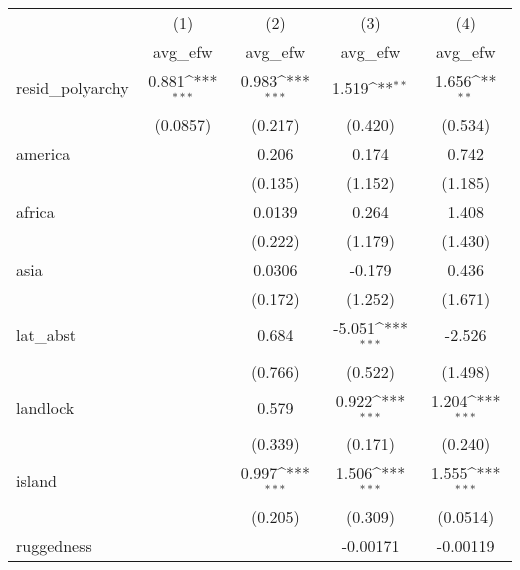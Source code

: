 {
\def\sym#1{\ifmmode^{#1}\else\(^{#1}\)\fi}
\begin{tabular}{l*{4}{c}}
\hline\hline
            &\multicolumn{1}{c}{(1)}&\multicolumn{1}{c}{(2)}&\multicolumn{1}{c}{(3)}&\multicolumn{1}{c}{(4)}\\
            &\multicolumn{1}{c}{avg\_efw}&\multicolumn{1}{c}{avg\_efw}&\multicolumn{1}{c}{avg\_efw}&\multicolumn{1}{c}{avg\_efw}\\
\hline
resid\_polyarchy&       0.881\sym{***}&       0.983\sym{***}&       1.519\sym{**} &       1.656\sym{**} \\
            &    (0.0857)         &     (0.217)         &     (0.420)         &     (0.534)         \\
[1em]
america     &                     &       0.206         &       0.174         &       0.742         \\
            &                     &     (0.135)         &     (1.152)         &     (1.185)         \\
[1em]
africa      &                     &      0.0139         &       0.264         &       1.408         \\
            &                     &     (0.222)         &     (1.179)         &     (1.430)         \\
[1em]
asia        &                     &      0.0306         &      -0.179         &       0.436         \\
            &                     &     (0.172)         &     (1.252)         &     (1.671)         \\
[1em]
lat\_abst    &                     &       0.684         &      -5.051\sym{***}&      -2.526         \\
            &                     &     (0.766)         &     (0.522)         &     (1.498)         \\
[1em]
landlock    &                     &       0.579         &       0.922\sym{***}&       1.204\sym{***}\\
            &                     &     (0.339)         &     (0.171)         &     (0.240)         \\
[1em]
island      &                     &       0.997\sym{***}&       1.506\sym{***}&       1.555\sym{***}\\
            &                     &     (0.205)         &     (0.309)         &    (0.0514)         \\
[1em]
ruggedness  &                     &                     &    -0.00171         &    -0.00119         \\

\end{tabular}}
